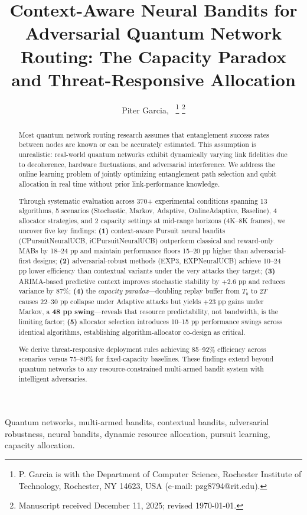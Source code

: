 \documentclass[10pt,twocolumn,journal]{IEEEtran}
\title{Context-Aware Neural Bandits for Adversarial Quantum Network Routing: The Capacity Paradox and Threat-Responsive Allocation}
\author{Piter Garcia,~\IEEEmembership{Student Member, IEEE}
\thanks{P. Garcia is with the Department of Computer Science, Rochester Institute of Technology, Rochester, NY 14623, USA (e-mail: pzg8794@rit.edu).}
\thanks{Manuscript received December 11, 2025; revised \today.}}
\begin{document}
\maketitle

\begin{abstract}

Most quantum network routing research assumes that entanglement success rates between nodes are known or can be accurately estimated. This assumption is unrealistic: real-world quantum networks exhibit dynamically varying link fidelities due to decoherence, hardware fluctuations, and adversarial interference. We address the online learning problem of jointly optimizing entanglement path selection and qubit allocation in real time without prior link-performance knowledge.

Through systematic evaluation across 370+ experimental conditions spanning 13 algorithms, 5 scenarios (Stochastic, Markov, Adaptive, OnlineAdaptive, Baseline), 4 allocator strategies, and 2 capacity settings at mid-range horizons (4K--8K frames), we uncover five key findings: \textbf{(1)} context-aware Pursuit neural bandits (CPursuitNeuralUCB, iCPursuitNeuralUCB) outperform classical and reward-only MABs by 18--24 pp and maintain performance floors 15--20 pp higher than adversarial-first designs; \textbf{(2)} adversarial-robust methods (EXP3, EXPNeuralUCB) achieve 10--24 pp lower efficiency than contextual variants under the very attacks they target; \textbf{(3)} ARIMA-based predictive context improves stochastic stability by +2.6 pp and reduces variance by 87\%; \textbf{(4)} the \emph{capacity paradox}—doubling replay buffer from $T_b$ to $2T$ causes 22--30 pp collapse under Adaptive attacks but yields +23 pp gains under Markov, a \textbf{48 pp swing}—reveals that resource predictability, not bandwidth, is the limiting factor; \textbf{(5)} allocator selection introduces 10--15 pp performance swings across identical algorithms, establishing algorithm-allocator co-design as critical.

We derive threat-responsive deployment rules achieving 85--92\% efficiency across scenarios versus 75--80\% for fixed-capacity baselines. These findings extend beyond quantum networks to any resource-constrained multi-armed bandit system with intelligent adversaries.

\end{abstract}

\begin{IEEEkeywords}
Quantum networks, multi-armed bandits, contextual bandits, adversarial robustness, neural bandits, dynamic resource allocation, pursuit learning, capacity allocation.
\end{IEEEkeywords}
\end{document}
